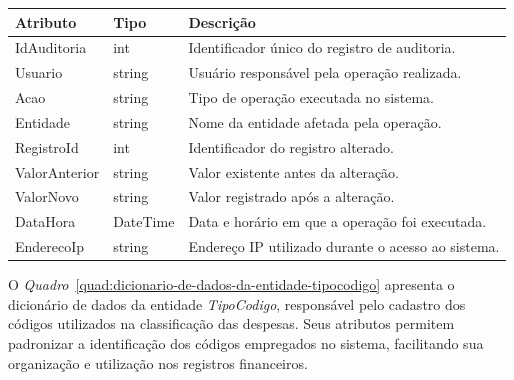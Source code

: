 \begin{quadro}[H]
\caption[Dicionário de dados da entidade Auditoria]{Dicionário de dados da entidade Auditoria}
\label{quad:dicionario-de-dados-da-entidade-auditoria}

\begin{tabular}{|p{}|p{}|p{}|}
\hline
\textbf{Atributo} & \textbf{Tipo} & \textbf{Descrição} \\ 
\hline
IdAuditoria & int & Identificador único do registro de auditoria. \\ 
\hline
Usuario & string & Usuário responsável pela operação realizada. \\ 
\hline
Acao & string & Tipo de operação executada no sistema. \\ 
\hline
Entidade & string & Nome da entidade afetada pela operação. \\ 
\hline
RegistroId & int & Identificador do registro alterado. \\ 
\hline
ValorAnterior & string & Valor existente antes da alteração. \\ 
\hline
ValorNovo & string & Valor registrado após a alteração. \\ 
\hline
DataHora & DateTime & Data e horário em que a operação foi executada. \\ 
\hline
EnderecoIp & string & Endereço IP utilizado durante o acesso ao sistema. \\ 
\hline
\end{tabular}


\end{quadro}


O \textit{Quadro}~\ref{quad:dicionario-de-dados-da-entidade-tipocodigo} apresenta o dicionário de dados da entidade \textit{TipoCodigo}, responsável pelo cadastro dos códigos utilizados na classificação das despesas. Seus atributos permitem padronizar a identificação dos códigos empregados no sistema, facilitando sua organização e utilização nos registros financeiros.

